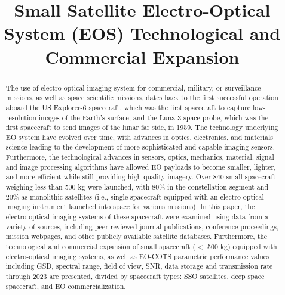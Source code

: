 \documentclass[final,5p,times,twocolumn,authoryear]{elsarticle}
\begin{document}
\begin{frontmatter}

\title{Small Satellite Electro-Optical System (EOS) Technological and Commercial Expansion}
%
%
\begin{abstract}
The use of electro-optical imaging system for commercial, military, or surveillance missions, as well as space scientific missions, dates back to the first successful operation aboard the US Explorer-6 spacecraft, which was the first spacecraft to capture low-resolution images of the Earth's surface, and the Luna-3 space probe, which was the first spacecraft to send images of the lunar far side, in 1959. The technology underlying EO system have evolved over time, with advances in optics, electronics, and materials science leading to the development of more sophisticated and capable imaging sensors. Furthermore, the technological advances in sensors, optics, mechanics, material, signal and image processing algorithms have allowed EO payloads to become smaller, lighter, and more efficient while still providing high-quality imagery.
Over 840 small spacecraft weighing less than 500 kg were launched, with 80\% in the constellation segment and 20\% as monolithic satellites (i.e., single spacecraft equipped with an electro-optical imaging instrument launched into space for various missions). In this paper, the electro-optical imaging systems of these spacecraft were examined using data from a variety of sources, including peer-reviewed journal publications, conference proceedings, mission webpages, and other publicly available satellite databases. 
Furthermore, the technological and commercial expansion of small spacecraft ($<$ 500 kg) equipped with electro-optical imaging systems, as well as EO-COTS parametric performance values including GSD, spectral range, field of view, SNR, data storage and transmission rate through 2023 are presented, divided by spacecraft types: SSO satellites, deep space spacecraft, and EO commercialization.
\end{abstract}


\end{frontmatter}
\end{document}
